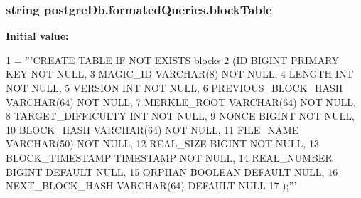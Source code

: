 \subsubsection[{block\+Table}]{\setlength{\rightskip}{0pt plus 5cm}string postgre\+Db.\+formated\+Queries.\+block\+Table}\label{namespacepostgreDb_1_1formatedQueries_abb029ebd46317f69b75128343a4449c6}
{\bfseries Initial value\+:}
\begin{DoxyCode}
1 = \textcolor{stringliteral}{'''CREATE TABLE IF NOT EXISTS blocks}
2 \textcolor{stringliteral}{                (ID                 BIGINT PRIMARY KEY  NOT NULL,}
3 \textcolor{stringliteral}{                MAGIC\_ID            VARCHAR(8)          NOT NULL,}
4 \textcolor{stringliteral}{                LENGTH              INT                 NOT NULL,}
5 \textcolor{stringliteral}{                VERSION             INT                 NOT NULL,}
6 \textcolor{stringliteral}{                PREVIOUS\_BLOCK\_HASH VARCHAR(64)         NOT NULL,}
7 \textcolor{stringliteral}{                MERKLE\_ROOT         VARCHAR(64)         NOT NULL,}
8 \textcolor{stringliteral}{                TARGET\_DIFFICULTY   INT                 NOT NULL,}
9 \textcolor{stringliteral}{                NONCE               BIGINT              NOT NULL,}
10 \textcolor{stringliteral}{                BLOCK\_HASH          VARCHAR(64)         NOT NULL,}
11 \textcolor{stringliteral}{                FILE\_NAME           VARCHAR(50)         NOT NULL,}
12 \textcolor{stringliteral}{                REAL\_SIZE           BIGINT              NOT NULL,}
13 \textcolor{stringliteral}{                BLOCK\_TIMESTAMP     TIMESTAMP           NOT NULL,}
14 \textcolor{stringliteral}{                REAL\_NUMBER         BIGINT              DEFAULT NULL,}
15 \textcolor{stringliteral}{                ORPHAN              BOOLEAN             DEFAULT NULL,}
16 \textcolor{stringliteral}{                NEXT\_BLOCK\_HASH     VARCHAR(64)         DEFAULT NULL}
17 \textcolor{stringliteral}{                );'''}
\end{DoxyCode}
\hypertarget{namespacepostgreDb_1_1formatedQueries_a0742871fe89794f66dea1edd1252acd6}{}
